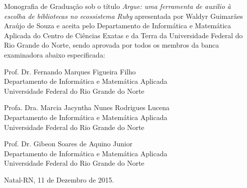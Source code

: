 \begin{folhadeaprovacao}
	\setlength{\ABNTsignthickness}{0.4pt}
	\setlength{\ABNTsignwidth}{10cm}
	
	\noindent 
	Monografia de Graduação sob o título \textit{Argue: uma ferramenta de auxilio à escolha de bibliotecas no ecossistema Ruby} apresentada por 
	Waldyr Guimarães Araújo de Souza e aceita pelo Departamento de Informática e Matemática Aplicada do
	Centro de Ciências Exatas e da Terra da Universidade Federal do Rio Grande do Norte,
	sendo aprovada por todos os membros da banca examinadora abaixo especificada:
		
	\assinatura
	{
		{\small Prof. Dr. Fernando Marques Figueira Filho} 															\\ 
		{\footnotesize
			Departamento de Informática e Matemática Aplicada 																	\\
		  	Universidade Federal do Rio Grande do Norte
		}
	}
		
	\assinatura
	{
		Profa. Dra. Marcia Jacyntha Nunes Rodrigues Lucena 						 \\ 
		{\footnotesize
			Departamento de Informática e Matemática Aplicada 																	 \\
		  	Universidade Federal do Rio Grande do Norte
		}
	}
		
	\assinatura
	{
		Prof. Dr. Gibeon Soares de Aquino Junior 						 \\ 
		{\footnotesize
			Departamento de Informática e Matemática Aplicada 																	 \\
		  	Universidade Federal do Rio Grande do Norte
		}
	}
		
	\vfill
	
	\begin{center}
		Natal-RN, 11 de Dezembro de 2015.
	\end{center}
\end{folhadeaprovacao}
